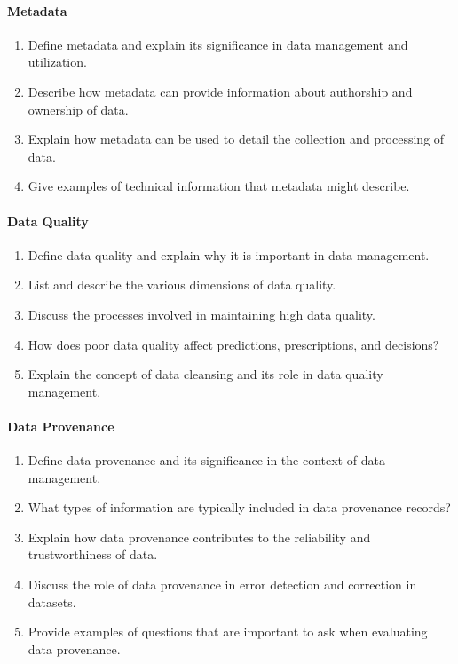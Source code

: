 \paragraph*{Metadata}
\begin{enumerate}
    \item Define metadata and explain its significance in data management and utilization.
    \item Describe how metadata can provide information about authorship and ownership of data.
    \item Explain how metadata can be used to detail the collection and processing of data.
    \item Give examples of technical information that metadata might describe.
\end{enumerate}
\paragraph*{Data Quality}
\begin{enumerate}
    \item Define data quality and explain why it is important in data management.
    \item List and describe the various dimensions of data quality.
    \item Discuss the processes involved in maintaining high data quality.
    \item How does poor data quality affect predictions, prescriptions, and decisions?
    \item Explain the concept of data cleansing and its role in data quality management.
\end{enumerate}
\paragraph*{Data Provenance}
\begin{enumerate}
    \item Define data provenance and its significance in the context of data management.
    \item What types of information are typically included in data provenance records?
    \item Explain how data provenance contributes to the reliability and trustworthiness of data.
    \item Discuss the role of data provenance in error detection and correction in datasets.
    \item Provide examples of questions that are important to ask when evaluating data provenance.
\end{enumerate}
